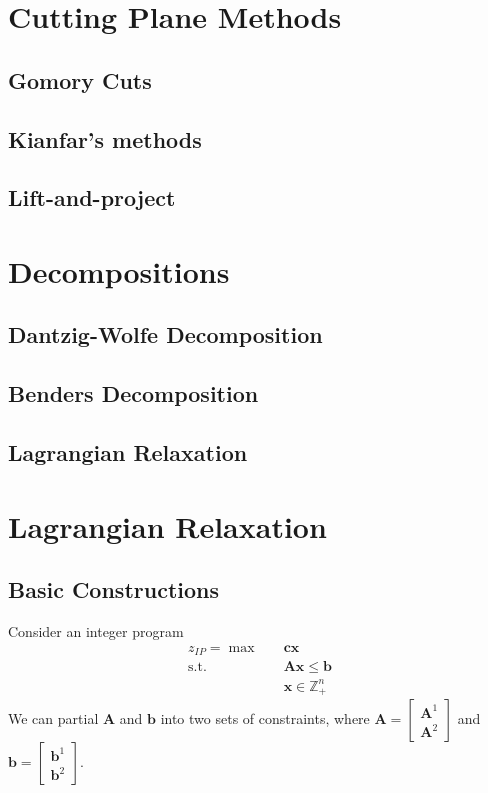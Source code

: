 		\chapter{Cutting Plane Methods}
			\section{Gomory Cuts}

			\section{Kianfar's methods}

			\section{Lift-and-project}

		\chapter{Decompositions}
			\section{Dantzig-Wolfe Decomposition}

			\section{Benders Decomposition}

			\section{Lagrangian Relaxation}

		\chapter{Lagrangian Relaxation}
			\section{Basic Constructions}
				Consider an integer program
				\begin{align*}
					z_{IP} = \max \quad & \mathbf{cx}\\
							\text{s.t.} \quad & \mathbf{Ax} \le \mathbf{b}\\
							&\mathbf{x} \in \mathbb{Z}_+^n
				\end{align*}
				We can partial $\mathbf{A}$ and $\mathbf{b}$ into two sets of constraints, where $\mathbf{A} = \begin{bmatrix}\mathbf{A}^1 \\ \mathbf{A}^2\end{bmatrix}$ and $\mathbf{b} = \begin{bmatrix}\mathbf{b}^1 \\ \mathbf{b}^2\end{bmatrix}$. 

